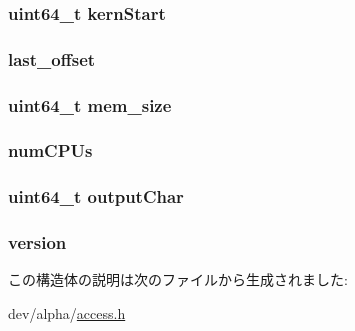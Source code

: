 \label{structAlphaAccess_a6741af28865e38d678856e45e22a097e}
\hypertarget{structAlphaAccess_a031a9a2b7278c18413f2c17d8dd9d77c}{
\subsubsection[{kernStart}]{\setlength{\rightskip}{0pt plus 5cm}uint64\_\-t {\bf kernStart}}}
\label{structAlphaAccess_a031a9a2b7278c18413f2c17d8dd9d77c}
\hypertarget{structAlphaAccess_a589399e9f33ae0028f3868360bf5a665}{
\subsubsection[{last\_\-offset}]{ {\bf last\_\-offset}}}
\label{structAlphaAccess_a589399e9f33ae0028f3868360bf5a665}
\hypertarget{structAlphaAccess_ae177731dc45fab0258bb6f72ebf37785}{
\subsubsection[{mem\_\-size}]{\setlength{\rightskip}{0pt plus 5cm}uint64\_\-t {\bf mem\_\-size}}}
\label{structAlphaAccess_ae177731dc45fab0258bb6f72ebf37785}
\hypertarget{structAlphaAccess_a62fe5772fdad74fda85b8510032153e0}{
\subsubsection[{numCPUs}]{ {\bf numCPUs}}}
\label{structAlphaAccess_a62fe5772fdad74fda85b8510032153e0}
\hypertarget{structAlphaAccess_a0e8d6cc1d8754f3ca0765d5587997a57}{
\subsubsection[{outputChar}]{\setlength{\rightskip}{0pt plus 5cm}uint64\_\-t {\bf outputChar}}}
\label{structAlphaAccess_a0e8d6cc1d8754f3ca0765d5587997a57}
\hypertarget{structAlphaAccess_acd99bb05ca015e7d74448acb1deba7ca}{
\subsubsection[{version}]{ {\bf version}}}
\label{structAlphaAccess_acd99bb05ca015e7d74448acb1deba7ca}


この構造体の説明は次のファイルから生成されました:\begin{DoxyCompactItemize}
\item 
dev/alpha/\hyperlink{alpha_2access_8h}{access.h}\end{DoxyCompactItemize}

